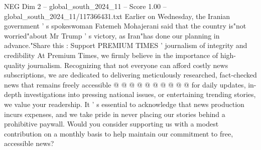 \begin{textsample}{NEG Dim 2 – global\_south\_2024\_11 – Score 1.00 – global\_south\_2024\_11/117366431.txt}
Earlier on Wednesday, the Iranian government ' s spokeswoman Fatemeh Mohajerani said that the country is"not worried"about Mr Trump ' s victory, as Iran"has done our planning in advance."Share this : Support PREMIUM TIMES ' journalism of integrity and credibility At Premium Times, we firmly believe in the importance of high-quality journalism.
Recognizing that not everyone can afford costly news subscriptions, we are dedicated to delivering meticulously researched, fact-checked news that remains freely accessible @ @ @ @ @ @ @ @ @ @ for daily updates, in-depth investigations into pressing national issues, or entertaining trending stories, we value your readership.
It ' s essential to acknowledge that news production incurs expenses, and we take pride in never placing our stories behind a prohibitive paywall.
Would you consider supporting us with a modest contribution on a monthly basis to help maintain our commitment to free, accessible news?

\end{textsample}
